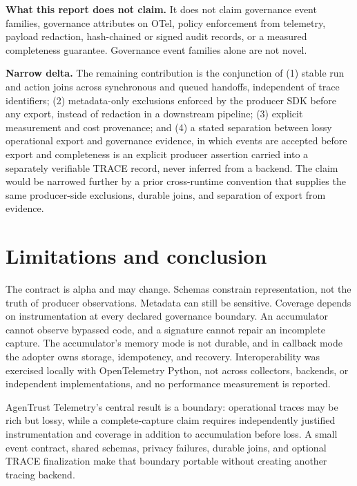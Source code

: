 \documentclass[10pt,letterpaper]{article}
\begin{document}
\textbf{What this report does not claim.} It does not claim governance event families, governance attributes on OTel, policy enforcement from telemetry, payload redaction, hash-chained or signed audit records, or a measured completeness guarantee. Governance event families alone are not novel.

\textbf{Narrow delta.} The remaining contribution is the conjunction of (1) stable run and action joins across synchronous and queued handoffs, independent of trace identifiers; (2) metadata-only exclusions enforced by the producer SDK before any export, instead of redaction in a downstream pipeline; (3) explicit measurement and cost provenance; and (4) a stated separation between lossy operational export and governance evidence, in which events are accepted before export and completeness is an explicit producer assertion carried into a separately verifiable TRACE record, never inferred from a backend. The claim would be narrowed further by a prior cross-runtime convention that supplies the same producer-side exclusions, durable joins, and separation of export from evidence.

\section{Limitations and conclusion}

The contract is alpha and may change. Schemas constrain representation, not the truth of producer observations. Metadata can still be sensitive. Coverage depends on instrumentation at every declared governance boundary. An accumulator cannot observe bypassed code, and a signature cannot repair an incomplete capture. The accumulator's memory mode is not durable, and in callback mode the adopter owns storage, idempotency, and recovery. Interoperability was exercised locally with OpenTelemetry Python, not across collectors, backends, or independent implementations, and no performance measurement is reported.

AgenTrust Telemetry's central result is a boundary: operational traces may be rich but lossy, while a complete-capture claim requires independently justified instrumentation and coverage in addition to accumulation before loss. A small event contract, shared schemas, privacy failures, durable joins, and optional TRACE finalization make that boundary portable without creating another tracing backend.



\end{document}
